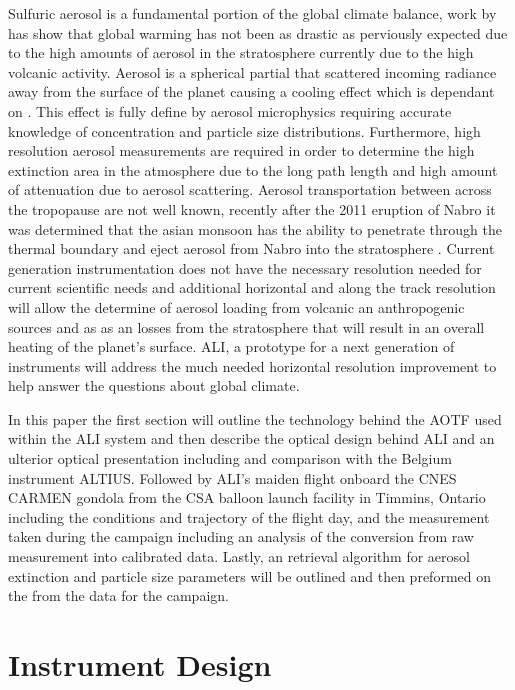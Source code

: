 \documentclass[12pt, draft]{article}
\begin{document}
Sulfuric aerosol is a fundamental portion of the global climate balance, work by \cite{Andreae2005} has show that global warming has not been as drastic as perviously expected due to the high amounts of aerosol in the stratosphere currently due to the high volcanic activity. Aerosol is a spherical partial that scattered incoming radiance away from the surface of the planet causing a cooling effect which is dependant on \citep{Kiehl1993}. This effect is fully define by aerosol microphysics requiring accurate knowledge of concentration and particle size distributions. Furthermore, high resolution aerosol measurements are required in order to determine the high extinction area in the atmosphere due to the long path length and high amount of attenuation due to aerosol scattering. Aerosol transportation between across the tropopause are not well known, recently after the 2011 eruption of Nabro it was determined that the asian monsoon has the ability to penetrate through the thermal boundary and eject aerosol from Nabro into the stratosphere \citep{Bourassa2012c}. Current generation instrumentation does not have the necessary resolution needed for current scientific needs and additional horizontal and along the track resolution will allow the determine of aerosol loading from volcanic an anthropogenic sources and as as an losses from the stratosphere that will result in an overall heating of the planet's surface. ALI, a prototype for a next generation of instruments will address the much needed horizontal resolution improvement to help answer the questions about global climate.

In this paper the first section will outline the technology behind the AOTF used within the ALI system and then describe the optical design behind ALI and an ulterior optical presentation including and comparison with the Belgium instrument ALTIUS. Followed by ALI's maiden flight onboard the CNES CARMEN gondola from the CSA balloon launch facility in Timmins, Ontario including the conditions and trajectory of the flight day, and the measurement taken during the campaign including an analysis of the conversion from raw measurement into calibrated data. Lastly, an retrieval algorithm for aerosol extinction and particle size parameters will be outlined and then preformed on the from the data for the campaign.

\section{Instrument Design}
\end{document}
